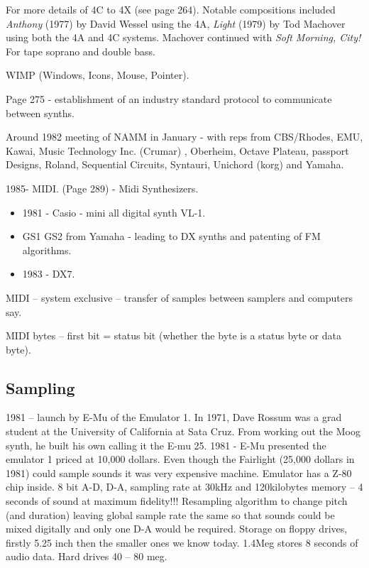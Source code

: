 For more details of 4C to 4X (see page 264).  Notable compositions included \textit{Anthony} (1977) by David Wessel using the 4A, \textit{Light} (1979) by Tod Machover using both the 4A and 4C systems.  Machover continued with \textit{Soft Morning, City!}  For tape soprano and double bass. 

WIMP (Windows, Icons, Mouse, Pointer).

Page 275 - establishment of an industry standard protocol to communicate between synths.

Around 1982 meeting of NAMM in January - with reps from CBS/Rhodes, EMU, Kawai, Music Technology Inc. (Crumar) , Oberheim, Octave Plateau, passport Designs, Roland,  Sequential Circuits, Syntauri, Unichord (korg) and Yamaha.

1985- MIDI. (Page 289) - Midi Synthesizers.

\begin{itemize}
\item 1981 - Casio - mini all digital synth VL-1.
\item GS1 GS2 from Yamaha - leading to DX synths and patenting of FM algorithms.
\item 1983 - DX7.
\end{itemize}

MIDI – system exclusive – transfer of samples between samplers and computers say.

MIDI bytes – first bit = status bit (whether the byte is a status byte or data byte).

\subsection{Sampling}

1981 – launch by E-Mu of the Emulator 1. In 1971, Dave Rossum was a grad student at the University of California at Sata Cruz.  From working out the Moog synth, he built his own calling it the E-mu 25. 1981 - E-Mu presented the emulator 1 priced at 10,000 dollars.
Even though the Fairlight (25,000 dollars in 1981) could sample sounds it was very expensive machine.  Emulator has a Z-80 chip inside. 8 bit A-D, D-A, sampling rate at 30kHz and 120kilobytes memory – 4 seconds of sound at maximum fidelity!!!   Resampling algorithm to change pitch (and duration) leaving global sample rate the same so that sounds could be mixed digitally and only one D-A would be required.  Storage on floppy drives, firstly 5.25 inch then the smaller ones we know today.  1.4Meg stores 8 seconds of audio data.  Hard drives 40 – 80 meg.


